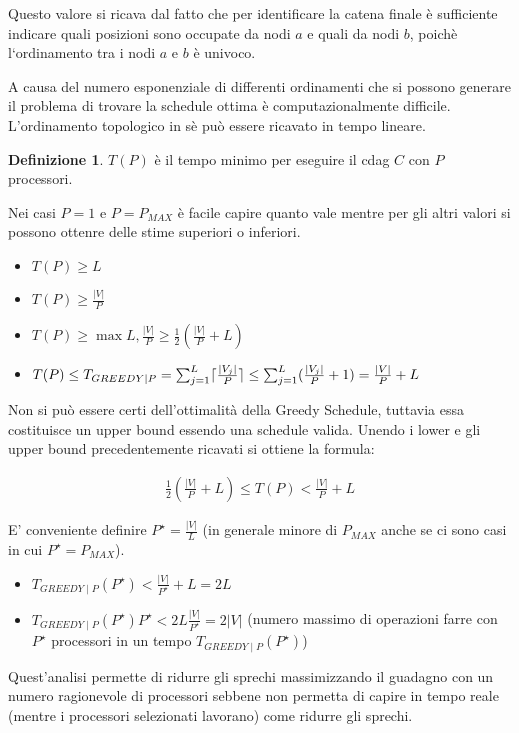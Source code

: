 \documentclass[a4paper,portrait,12pt]{article}
\theoremstyle{definition}
\newtheorem{definition}{Definizione}[section]
\providecommand{\abs}[1]{\lvert#1\rvert}
\DeclarePairedDelimiter{\ceil}{\lceil}{\rceil}
\begin{document}
Questo valore si ricava dal fatto che per identificare la catena finale è sufficiente indicare quali posizioni sono occupate da nodi $a$ e quali da nodi $b$, poichè l‘ordinamento tra i nodi $a$ e $b$ è univoco.

A causa del numero esponenziale di differenti ordinamenti che si possono generare il problema di trovare la schedule ottima è computazionalmente difficile.
L’ordinamento topologico in sè può essere ricavato in tempo lineare.

\begin{definition}
$T(P)$ è il tempo minimo per eseguire il cdag $C$ con $P$ processori.
\end{definition}

Nei casi $P=1$ e $P=P_{MAX}$ è facile capire quanto vale mentre per gli altri valori si possono ottenre delle stime superiori o inferiori.
\begin{itemize}
\item $T(P) \ge L$
\item $T(P) \ge \frac{\abs{V}}{P}$
\item $T(P) \ge \max{L,\frac{\abs{V}}{P}} \ge \frac{1}{2}(\frac{\abs{V}}{P} + L)$
\item $T(P) \le T_{GREEDY \mid P} = \sum_{j=1}^{L} \ceil{\frac{\abs{V_j}}{P}} \le \sum_{j=1}^{L}(\frac{\abs{V_j}}{P} + 1) = \frac{\abs{V}}{P} + L$
\end{itemize}

Non si può essere certi dell’ottimalità della Greedy Schedule, tuttavia essa costituisce un upper bound essendo una schedule valida.
Unendo i lower e gli upper bound precedentemente ricavati si ottiene la formula:

\begin{align*}
\frac{1}{2}(\frac{\abs{V}}{P} + L) \le T(P) < \frac{\abs{V}}{P} + L
\end{align*}

E’ conveniente definire $P^{\star} = \frac{\abs{V}}{L}$ (in generale minore di $P_{MAX}$ anche se ci sono casi in cui $P^{\star} = P_{MAX}$).
\begin{itemize}
\item $T_{GREEDY \mid P} (P^{\star}) < \frac{\abs{V}}{P^{\star}} + L = 2L$
\item $T_{GREEDY \mid P} (P^{\star}) P^{\star} < 2L \frac{\abs{V}}{P^{\star}} = 2 \abs{V}$ (numero massimo di operazioni farre con $P^{\star}$ processori in un tempo $T_{GREEDY \mid P} (P^{\star})$)
\end{itemize}

Quest’analisi permette di ridurre gli sprechi massimizzando il guadagno con un numero ragionevole di processori sebbene non permetta di capire in tempo reale (mentre i processori selezionati lavorano) come ridurre gli sprechi.
\end{document}
